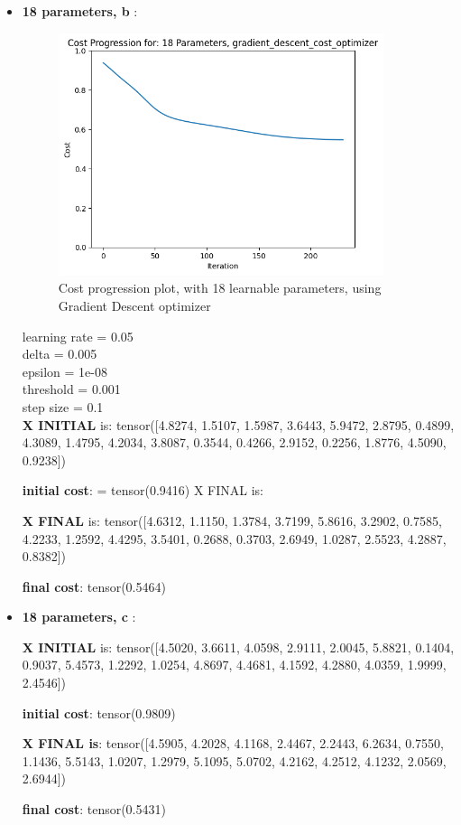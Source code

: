 \documentclass[inscr,ack,preface]{diphdthesis}
\begin{document}
\begin{itemize}
    \item \textbf{18 parameters, b } :

\begin{figure}[ht]
\begin{center}
    \includegraphics[width=0.9\textwidth]{18.png}
    \caption{Cost progression plot, with 18 learnable parameters, using Gradient Descent optimizer} 
    \label{fig:enter-label}
    \end{center}
\end{figure}

learning rate =  0.05 \\
delta =  0.005 \\
epsilon =  1e-08 \\
threshold =  0.001 \\
step size =  0.1 \\

\textbf{X INITIAL} is: tensor([4.8274, 1.5107, 1.5987, 3.6443, 5.9472, 2.8795, 0.4899, 4.3089, 1.4795,
        4.2034, 3.8087, 0.3544, 0.4266, 2.9152, 0.2256, 1.8776, 4.5090, 0.9238])
        
\textbf{initial cost}: = tensor(0.9416)
    X FINAL is:

\textbf{X FINAL} is: tensor([4.6312, 1.1150, 1.3784, 3.7199, 5.8616, 3.2902, 0.7585, 4.2233, 1.2592,
        4.4295, 3.5401, 0.2688, 0.3703, 2.6949, 1.0287, 2.5523, 4.2887, 0.8382])
        
\textbf{final cost}: tensor(0.5464)


\item \textbf{18 parameters, c }:

\textbf{X INITIAL} is:
 tensor([4.5020, 3.6611, 4.0598, 2.9111, 2.0045, 5.8821, 0.1404, 0.9037, 5.4573,
        1.2292, 1.0254, 4.8697, 4.4681, 4.1592, 4.2880, 4.0359, 1.9999, 2.4546])

\textbf{initial cost}: tensor(0.9809)

\textbf{X FINAL is}:
 tensor([4.5905, 4.2028, 4.1168, 2.4467, 2.2443, 6.2634, 0.7550, 1.1436, 5.5143,
        1.0207, 1.2979, 5.1095, 5.0702, 4.2162, 4.2512, 4.1232, 2.0569, 2.6944])

\textbf{final cost}: tensor(0.5431)

\end{itemize}
\end{document}
